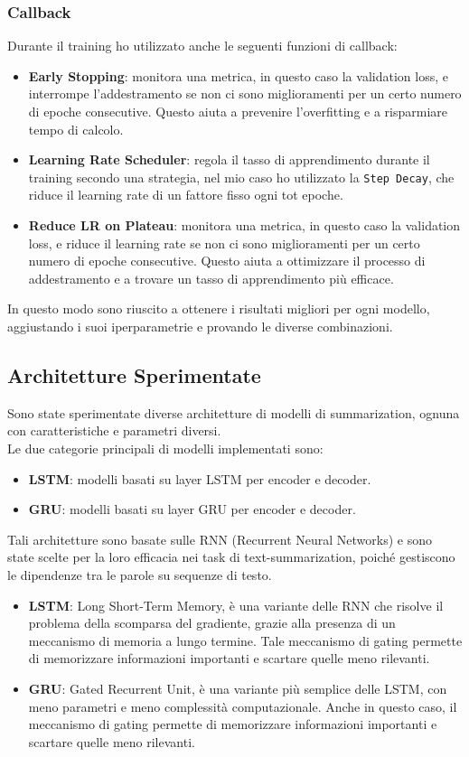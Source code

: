 \subsubsection{Callback}
Durante il training ho utilizzato anche le seguenti funzioni di callback:
\begin{itemize}
    \item \textbf{Early Stopping}: monitora una metrica, in questo caso la validation loss, e interrompe l'addestramento se non ci sono miglioramenti per un certo numero di epoche consecutive. Questo aiuta a prevenire l'overfitting e a risparmiare tempo di calcolo.
    \item \textbf{Learning Rate Scheduler}: regola il tasso di apprendimento durante il training secondo una strategia, nel mio caso ho utilizzato la \texttt{Step Decay}, che riduce il learning rate di un fattore fisso ogni tot epoche.
    \item \textbf{Reduce LR on Plateau}: monitora una metrica, in questo caso la validation loss, e riduce il learning rate se non ci sono miglioramenti per un certo numero di epoche consecutive. Questo aiuta a ottimizzare il processo di addestramento e a trovare un tasso di apprendimento più efficace.
\end{itemize}
In questo modo sono riuscito a ottenere i risultati migliori per ogni modello, aggiustando i suoi iperparametrie e provando le diverse combinazioni.

\subsection{Architetture Sperimentate}
Sono state sperimentate diverse architetture di modelli di summarization, ognuna con caratteristiche e parametri diversi.\\
Le due categorie principali di modelli implementati sono:
\begin{itemize}
    \item \textbf{LSTM}: modelli basati su layer LSTM per encoder e decoder.
    \item \textbf{GRU}: modelli basati su layer GRU per encoder e decoder.
\end{itemize}
Tali architetture sono basate sulle RNN (Recurrent Neural Networks) e sono state scelte per la loro efficacia nei task di text-summarization, poiché
gestiscono le dipendenze tra le parole su sequenze di testo.\\
\begin{itemize}
    \item \textbf{LSTM}: Long Short-Term Memory, è una variante delle RNN che risolve il problema della scomparsa del gradiente, grazie alla presenza di un meccanismo di memoria a lungo termine.
          Tale meccanismo di gating permette di memorizzare informazioni importanti e scartare quelle meno rilevanti.
    \item \textbf{GRU}: Gated Recurrent Unit, è una variante più semplice delle LSTM, con meno parametri e meno complessità computazionale.
          Anche in questo caso, il meccanismo di gating permette di memorizzare informazioni importanti e scartare quelle meno rilevanti.
\end{itemize}

